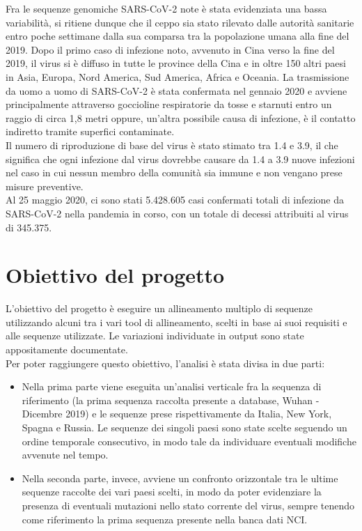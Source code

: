 \documentclass[a4paper,10pt]{article}
\begin{document}
Fra le sequenze genomiche SARS-CoV-2 note è stata evidenziata una bassa variabilità, si ritiene dunque che il ceppo sia stato rilevato dalle autorità sanitarie entro poche settimane dalla sua comparsa tra la popolazione umana alla fine del 2019.
Dopo il primo caso di infezione noto, avvenuto in Cina verso la fine del 2019, il virus si è diffuso in tutte le province della Cina e in oltre 150 altri paesi in Asia, Europa, Nord America, Sud America, Africa e Oceania.
La trasmissione da uomo a uomo di SARS-CoV-2 è stata confermata nel gennaio 2020 e avviene principalmente attraverso goccioline respiratorie da tosse e starnuti entro un raggio di circa 1,8 metri oppure, un'altra possibile causa di infezione, è il contatto indiretto tramite superfici contaminate.\\
Il numero di riproduzione di base del virus è stato stimato tra 1.4 e 3.9, il che significa che ogni infezione dal virus dovrebbe causare da 1.4 a 3.9 nuove infezioni nel caso in cui nessun membro della comunità sia immune e non vengano prese misure preventive.\\
Al 25 maggio 2020, ci sono stati 5.428.605 casi confermati totali di infezione da SARS-CoV-2 nella pandemia in corso, con un totale di decessi attribuiti al virus di 345.375. 

\newpage

\section{Obiettivo del progetto}
L'obiettivo del progetto è eseguire un allineamento multiplo di sequenze utilizzando alcuni tra i vari tool di allineamento, scelti in base ai suoi requisiti e alle sequenze utilizzate. Le variazioni individuate in output sono state appositamente documentate. \\
Per poter raggiungere questo obiettivo, l'analisi è stata divisa in due parti:
\begin{itemize}
\item Nella prima parte viene eseguita un'analisi verticale fra la sequenza di riferimento (la prima sequenza raccolta presente a database, Wuhan - Dicembre 2019) e le sequenze prese rispettivamente da Italia, New York, Spagna e Russia. Le sequenze dei singoli paesi sono state scelte seguendo un ordine temporale consecutivo, in modo tale da individuare eventuali modifiche avvenute nel tempo.
\item Nella seconda parte, invece, avviene un confronto orizzontale tra le ultime sequenze raccolte dei vari paesi scelti, in modo da poter evidenziare la presenza di eventuali mutazioni nello stato corrente del virus, sempre tenendo come riferimento la prima sequenza presente nella banca dati NCI. 
\end{itemize}
\end{document}

